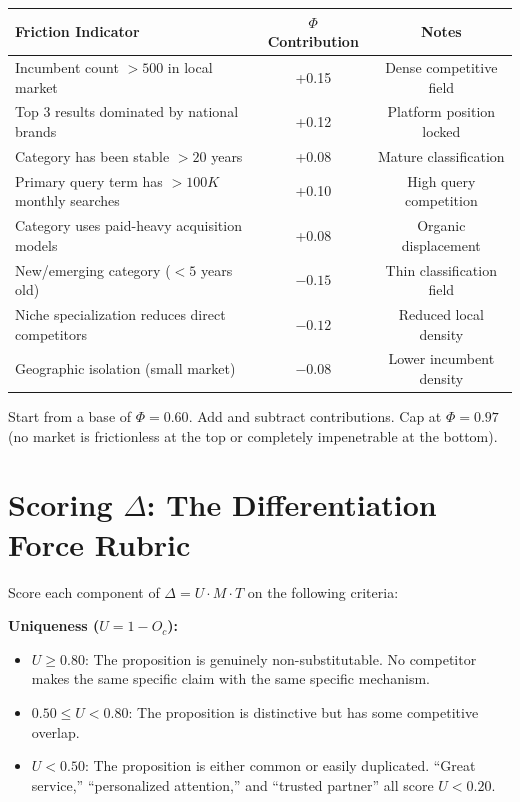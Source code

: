 \documentclass[12pt, openany]{book}
\theoremstyle{thmstyle}
\theoremstyle{defstyle}
\begin{document}
\begin{center}
\begin{tabular}{lcc}
\toprule
\textbf{Friction Indicator} & \textbf{$\Phi$ Contribution} & \textbf{Notes} \\
\midrule
Incumbent count $> 500$ in local market & +0.15 & Dense competitive field \\
Top 3 results dominated by national brands & +0.12 & Platform position locked \\
Category has been stable $> 20$ years & +0.08 & Mature classification \\
Primary query term has $> 100K$ monthly searches & +0.10 & High query competition \\
Category uses paid-heavy acquisition models & +0.08 & Organic displacement \\
New/emerging category ($< 5$ years old) & $-0.15$ & Thin classification field \\
Niche specialization reduces direct competitors & $-0.12$ & Reduced local density \\
Geographic isolation (small market) & $-0.08$ & Lower incumbent density \\
\bottomrule
\end{tabular}
\end{center}

Start from a base of $\Phi = 0.60$. Add and subtract contributions. Cap at $\Phi = 0.97$ (no market is frictionless at the top or completely impenetrable at the bottom).

\section{Scoring $\Delta$: The Differentiation Force Rubric}

Score each component of $\Delta = U \cdot M \cdot T$ on the following criteria:

\textbf{Uniqueness ($U = 1 - O_c$):}
\begin{itemize}[leftmargin=1.5em]
  \item $U \geq 0.80$: The proposition is genuinely non-substitutable. No competitor makes the same specific claim with the same specific mechanism.
  \item $0.50 \leq U < 0.80$: The proposition is distinctive but has some competitive overlap.
  \item $U < 0.50$: The proposition is either common or easily duplicated. ``Great service,'' ``personalized attention,'' and ``trusted partner'' all score $U < 0.20$.
\end{itemize}
\end{document}
